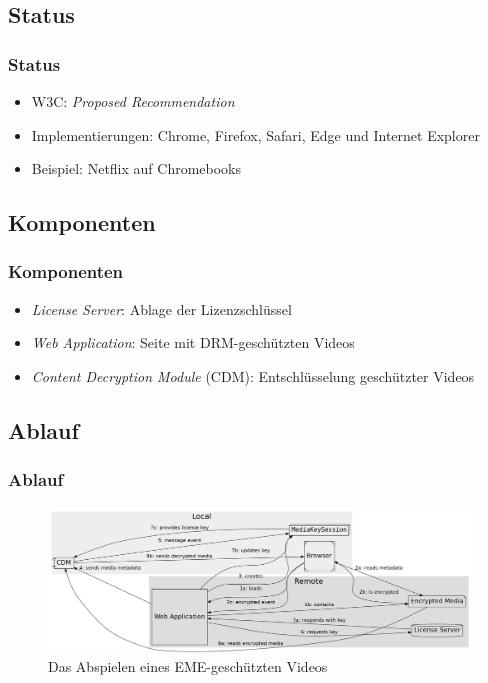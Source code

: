 \documentclass[aspectratio=169]{beamer}
\begin{document}
\subsection{Status}
\begin{frame}
\frametitle{Status}
\begin{itemize}
    \item{W3C: \textit{Proposed Recommendation}}
    \item{Implementierungen: Chrome, Firefox, Safari, Edge und Internet Explorer}
    \item{Beispiel: Netflix auf Chromebooks}
\end{itemize}
\end{frame}

\subsection{Komponenten}
\begin{frame}
\frametitle{Komponenten}
\begin{itemize}
    \item{\textit{License Server}: Ablage der Lizenzschlüssel}
    \item{\textit{Web Application}: Seite mit DRM-geschützten Videos}
    \item{\textit{Content Decryption Module} (CDM): Entschlüsselung geschützter Videos}
\end{itemize}
\end{frame}

\subsection{Ablauf}
\begin{frame}
\frametitle{Ablauf}
\begin{figure}
    \includegraphics[width=1.0\textwidth]{eme-clustered.png}
    \caption{Das Abspielen eines EME-geschützten Videos}
    \label{fig:EME}
\end{figure}
\end{frame}
\end{document}
